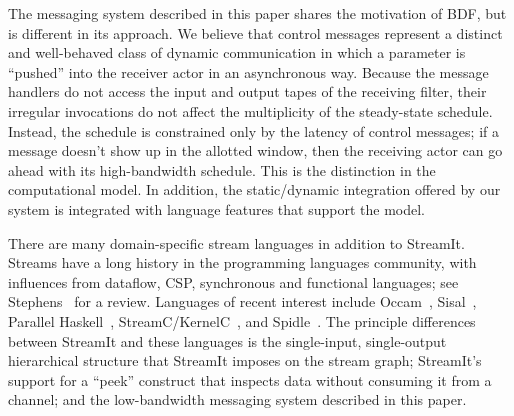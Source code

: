 The messaging system described in this paper shares the motivation of
BDF, but is different in its approach.  We believe that control
messages represent a distinct and well-behaved class of dynamic
communication in which a parameter is ``pushed'' into the receiver
actor in an asynchronous way.  Because the message handlers do not
access the input and output tapes of the receiving filter, their
irregular invocations do not affect the multiplicity of the
steady-state schedule.  Instead, the schedule is constrained only by
the latency of control messages; if a message doesn't show up in the
allotted window, then the receiving actor can go ahead with its
high-bandwidth schedule.  This is the distinction in the computational
model.  In addition, the static/dynamic integration offered by our
system is integrated with language features that support the model.

There are many domain-specific stream languages in addition to
StreamIt.  Streams have a long history in the programming languages
community, with influences from dataflow, CSP, synchronous and
functional languages; see Stephens~\cite{survey97} for a review.
Languages of recent interest include Occam~\cite{occammanual},
Sisal~\cite{sisal}, Parallel Haskell~\cite{ph},
StreamC/KernelC~\cite{imagine03ieee}, and Spidle~\cite{spidle02}.  The
principle differences between StreamIt and these languages is the
single-input, single-output hierarchical structure that StreamIt
imposes on the stream graph; StreamIt's support for a ``peek''
construct that inspects data without consuming it from a channel; and
the low-bandwidth messaging system described in this paper.

